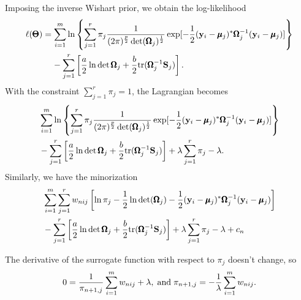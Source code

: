 \documentclass{scrartcl}
\begin{document}
Imposing the inverse Wishart prior, we obtain the log-likelihood
\begin{equation}
\begin{split}
\ell (\pmb{\Theta}) & =
\sum_{i=1}^m \ln
\left\lbrace
\sum_{j=1}^r \pi_j {1 \over ({2\pi})^{p \over 2} \det(\pmb{\Omega}_j)^{1 \over 2}} \exp[-{1\over 2}(\mathbf{y}_i-\pmb{\mu}_j)^*\pmb{\Omega}_j^{-1}(\mathbf{y}_i-\pmb{\mu}_j)]
\right\rbrace \\
& \;\;\;\; - \sum_{j=1}^r \left[ {a \over 2} \ln \det \pmb{\Omega}_j + {b \over 2} \mathrm{tr}(\pmb{\Omega}_j^{-1}\mathbf{S}_j) \right].
\end{split}
\end{equation}
With the constraint $\sum_{j=1}^r \pi_j = 1$, the Lagrangian becomes
\begin{equation}
\begin{split}
& \sum_{i=1}^m \ln
\left\lbrace
\sum_{j=1}^r \pi_j {1 \over ({2\pi})^{p \over 2} \det(\pmb{\Omega}_j)^{1 \over 2}} \exp[-{1\over 2}(\mathbf{y}_i-\pmb{\mu}_j)^*\pmb{\Omega}_j^{-1}(\mathbf{y}_i-\pmb{\mu}_j)]
\right\rbrace \\
& - \sum_{j=1}^r \left[ {a \over 2} \ln \det \pmb{\Omega}_j + {b \over 2} \mathrm{tr}(\pmb{\Omega}_j^{-1}\mathbf{S}_j) \right] + \lambda \sum_{j=1}^r \pi_j - \lambda.
\end{split}
\end{equation}
Similarly, we have the minorization
\begin{equation}
\begin{split}
& \sum_{i=1}^m \sum_{j=1}^r { w_{nij} }
    \left[ \ln \pi_j - {1 \over 2} \ln \det(\pmb{\Omega}_j) -{1\over 2}(\mathbf{y}_i-\pmb{\mu}_j)^*\pmb{\Omega}_j^{-1}(\mathbf{y}_i-\pmb{\mu}_j) \right] \\
& - \sum_{j=1}^r \left[ {a \over 2} \ln \det \pmb{\Omega}_j + {b \over 2} \mathrm{tr}(\pmb{\Omega}_j^{-1}\mathbf{S}_j) \right] + \lambda \sum_{j=1}^r \pi_j - \lambda + c_n
\end{split}
\end{equation}

The derivative of the surrogate function with respect to $\pi_j$ doesn't change, so
\begin{equation}
0 = {1 \over \pi_{n+1,j}} \sum_{i=1}^m w_{nij} + \lambda , \; \text{and\;} \pi_{n+1,j} = - {1 \over \lambda} \sum_{i=1}^m w_{nij}.
\end{equation}
\end{document}

